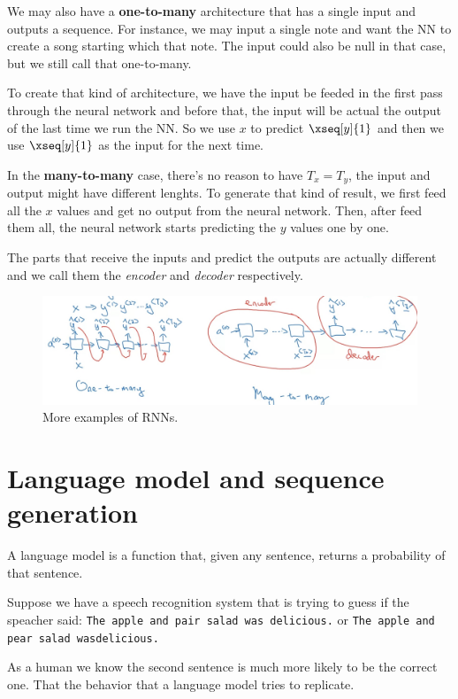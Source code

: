 \documentclass[12pt, a4paper, oneside]{book}
\begin{document}
We may also have a \textbf{one-to-many} architecture that has a single input and
outputs a sequence. For instance, we may input a single note and want the NN to
create a song starting which that note. The input could also be null in that
case, but we still call that one-to-many.

To create that kind of architecture, we have the input be feeded in the first
pass through the neural network and before that, the input will be actual the
output of the last time we run the NN. So we use $x$ to predict $\xseq[y]{1}$
and then we use $\xseq[y]{1}$ as the input for the next time.

In the \textbf{many-to-many} case, there's no reason to have $T_x=T_y$, the
input and output might have different lenghts. To generate that kind of result,
we first feed all the $x$ values and get no output from the neural network.
Then, after feed them all, the neural network starts predicting the $y$ values
one by one.

The parts that receive the inputs and predict the outputs are actually different
and we call them the \textit{encoder} and \textit{decoder} respectively.

\begin{figure}[h]
\centering
\includegraphics[scale=0.4]{Res/RNN-types2.jpg}
\caption{More examples of RNNs.}
\label{RNN-types2.jpg}
\end{figure}

\section{Language model and sequence generation}%
\label{sec:language_model_and_sequence_generation}

A language model is a function that, given any sentence, returns a probability
of that sentence.

Suppose we have a speech recognition system that is trying to guess if the
speacher said: \texttt{The apple and pair salad was delicious.} or \texttt{The
apple and pear salad was\nl delicious.}

As a human we know the second sentence is much more likely to be the correct
one. That the behavior that a language model tries to replicate.
\end{document}
